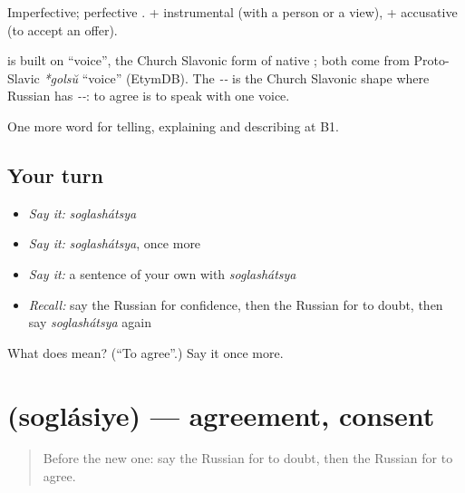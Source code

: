 Imperfective; perfective \emph{}. \emph{ } + instrumental (with a person or a view), \emph{} + accusative (to accept an offer).

\begin{cousinweb}
\textbf{} is built on \emph{} \textquotedblleft{}voice\textquotedblright{}, the Church Slavonic form of native \emph{}; both come from Proto-Slavic \emph{*golsŭ} \textquotedblleft{}voice\textquotedblright{} (EtymDB). The \emph{--} is the Church Slavonic shape where Russian has \emph{--}: to agree is to speak with one voice.
\end{cousinweb}

\begin{grammarlens}[title={What you've built}]
One more word for telling, explaining and describing at B1.
\end{grammarlens}

\subsection*{Your turn}
\begin{itemize}
\raggedright
  \item \emph{Say it:} \emph{soglashátsya}
  \item \emph{Say it:} \emph{soglashátsya}, once more
  \item \emph{Say it:} a sentence of your own with \emph{soglashátsya}
  \item \emph{Recall:} say the Russian for confidence, then the Russian for to doubt, then say \emph{soglashátsya} again
\end{itemize}

\begin{tcolorbox}[breakable,colback=teal!4,colframe=teal!35!black,title={Before you move on}]
What does  mean? (\textquotedblleft{}To agree\textquotedblright{}.) Say it once more.
\end{tcolorbox}
\section[\texorpdfstring{\ru{согласие} (soglásiye)}{согласие (soglásiye)}]{ (soglásiye) — agreement, consent}

\label{lesson:RU-C340-soglasie}



\begin{quote}
Before the new one: say the Russian for to doubt, then the Russian for to agree.
\end{quote}

